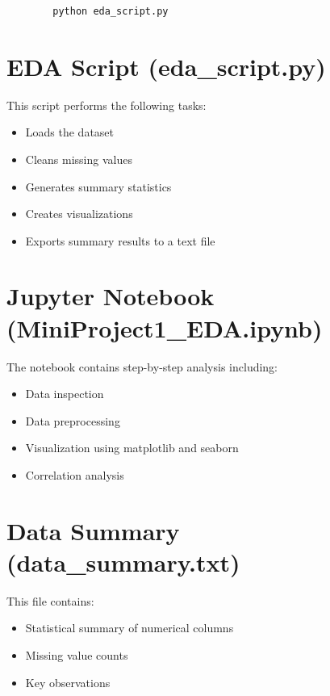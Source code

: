 \documentclass[12pt]{article}
\begin{document}
	\begin{verbatim}
		python eda_script.py
	\end{verbatim}
	
	\section{EDA Script (eda\_script.py)}
	
	This script performs the following tasks:
	
	\begin{itemize}
		\item Loads the dataset
		\item Cleans missing values
		\item Generates summary statistics
		\item Creates visualizations
		\item Exports summary results to a text file
	\end{itemize}
	
	\section{Jupyter Notebook (MiniProject1\_EDA.ipynb)}
	
	The notebook contains step-by-step analysis including:
	
	\begin{itemize}
		\item Data inspection
		\item Data preprocessing
		\item Visualization using matplotlib and seaborn
		\item Correlation analysis
	\end{itemize}
	
	\section{Data Summary (data\_summary.txt)}
	
	This file contains:
	
	\begin{itemize}
		\item Statistical summary of numerical columns
		\item Missing value counts
		\item Key observations
	\end{itemize}
	
\end{document}
